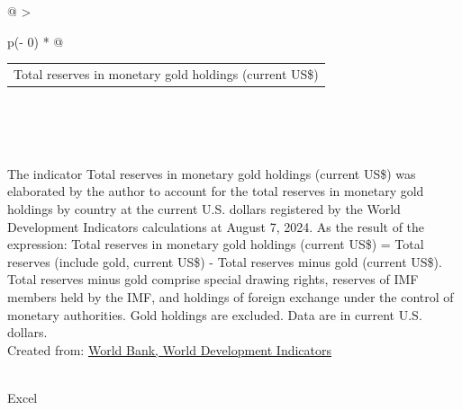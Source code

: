 \documentclass[
]{article}
\newenvironment{LTR}{\beginL}{\endL}
\begin{document}
\begin{longtable}[]{@{}
  >{\raggedright\arraybackslash}p{(\columnwidth - 0\tabcolsep) * }@{}}
\toprule\noalign{}
\endhead
\bottomrule\noalign{}
\endlastfoot
\begin{minipage}[t]{\linewidth}\raggedright
\hypertarget{REPORT_PREVIEW_divdropdown}{}
\begin{longtable}[]{@{}l@{}}
\toprule\noalign{}
\endhead
\bottomrule\noalign{}
\endlastfoot
Total reserves in monetary gold holdings (current US\$)
\protect\hypertarget{REPORT_PREVIEW_meta_link_page_WDI_Series}{}{{{}}} \\
\end{longtable}
\end{minipage} \\
 \\
\begin{minipage}[t]{\linewidth}\raggedright
\hypertarget{container}{}
\begin{LTR}
\end{LTR}
\end{minipage} \\
\protect\hypertarget{REPORT_PREVIEW_lblXAxis}{}{}
\protect\hypertarget{REPORT_PREVIEW_lblFooter}{}{The indicator Total
reserves in monetary gold holdings (current US\$) was elaborated by the
author to account for the total reserves in monetary gold holdings by
country at the current U.S. dollars registered by the World Development
Indicators calculations at August 7, 2024. As the result of the
expression: Total reserves in monetary gold holdings (current US\$) =
Total reserves (include gold, current US\$) - Total reserves minus gold
(current US\$). Total reserves minus gold comprise special drawing
rights, reserves of IMF members held by the IMF, and holdings of foreign
exchange under the control of monetary authorities. Gold holdings are
excluded. Data are in current U.S. dollars.} \\
\protect\hypertarget{REPORT_PREVIEW_sReportSource}{}{Created from:}
\protect\hypertarget{REPORT_PREVIEW_hplDatabaseName}{\href{javascript:Shared(\textquotesingle{}/Total-reserve-funds-of-gold-money-capital-(U.S.-current-dollars)-of-the-top-ten-bearers-1970-2024/id/30b9d4bf\textquotesingle{});}{World
Bank, World Development Indicators}} \\
\textbf{} \protect\hypertarget{REPORT_PREVIEW_sDisclaimerMsg}{}{ } \\
\end{longtable}

{Excel}
\end{document}
